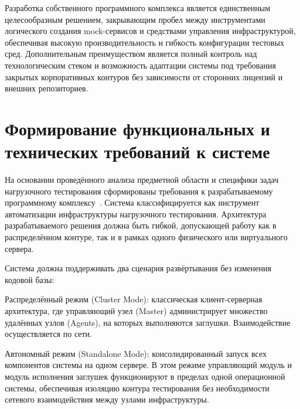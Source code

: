 
Разработка собственного программного комплекса является единственным целесообразным решением, закрывающим пробел между инструментами логического создания mock-сервисов и средствами управления инфраструктурой, обеспечивая высокую производительность и гибкость конфигурации тестовых сред.
Дополнительным преимуществом является полный контроль над технологическим стеком и возможность адаптации системы под требования закрытых корпоративных контуров без зависимости от сторонних лицензий и внешних репозиториев.

\section{Формирование функциональных и технических требований к системе}

На основании проведённого анализа предметной области и специфики задач нагрузочного тестирования сформированы требования к разрабатываемому программному комплексу~\cite{wiegers-requirements, gost-34-602-2020}. Система классифицируется как инструмент автоматизации инфраструктуры нагрузочного тестирования. Архитектура разрабатываемого решения должна быть гибкой, допускающей работу как в распределённом контуре, так и в рамках одного физического или виртуального сервера.


Система должна поддерживать два сценария развёртывания без изменения кодовой базы:

\begin{compactlist}
\item Распределённый режим (Cluster Mode): классическая клиент-серверная архитектура, где управляющий узел (Master) администрирует множество удалённых узлов (Agents), на которых выполняются заглушки. Взаимодействие осуществляется по сети.
\item Автономный режим (Standalone Mode): консолидированный запуск всех компонентов системы на одном сервере. В этом режиме управляющий модуль и модуль исполнения заглушек функционируют в пределах одной операционной системы, обеспечивая изоляцию контура тестирования без необходимости сетевого взаимодействия между узлами инфраструктуры.
\end{compactlist}

